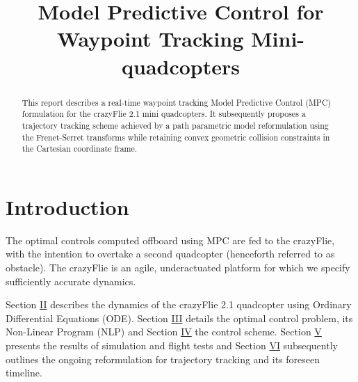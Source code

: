 \documentclass[conference]{IEEEtran}
\begin{document}
\title{Model Predictive Control for Waypoint Tracking Mini-quadcopters\\}
\author{
}
\maketitle

\begin{abstract}
This report describes a real-time waypoint tracking Model Predictive Control (MPC) formulation for the crazyFlie 2.1 mini quadcopters. It subsequently proposes a trajectory tracking scheme achieved by a path parametric model reformulation using the Frenet-Serret transforms while retaining convex geometric collision constraints in the Cartesian coordinate frame.

\end{abstract}

\section{Introduction}\label{Introduction}
The optimal controls computed offboard using MPC are fed to the crazyFlie, with the intention to overtake a second quadcopter (henceforth referred to as obstacle). The crazyFlie is an agile, underactuated platform for which we specify sufficiently accurate dynamics.

Section \hyperref[Section2]{II} describes the dynamics of the crazyFlie 2.1 quadcopter using Ordinary Differential Equations (ODE). Section \hyperref[Section3]{III} details the optimal control problem, its Non-Linear Program (NLP) and Section \hyperref[Section4]{IV} the control scheme. Section \hyperref[Section5]{V} presents the results of simulation and flight tests and Section \hyperref[Section6]{VI} subsequently outlines the ongoing reformulation for trajectory tracking and its foreseen timeline.
\end{document}
